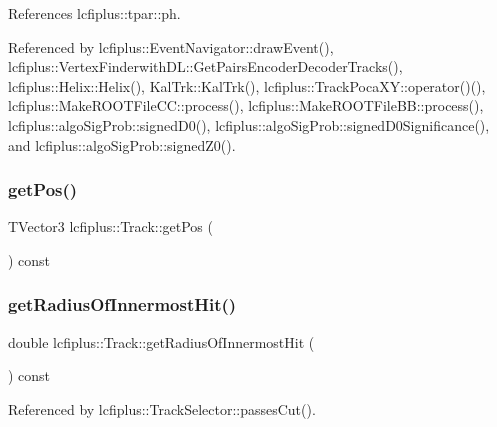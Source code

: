 References lcfiplus\+::tpar\+::ph.



Referenced by lcfiplus\+::\+Event\+Navigator\+::draw\+Event(), lcfiplus\+::\+Vertex\+Finderwith\+D\+L\+::\+Get\+Pairs\+Encoder\+Decoder\+Tracks(), lcfiplus\+::\+Helix\+::\+Helix(), Kal\+Trk\+::\+Kal\+Trk(), lcfiplus\+::\+Track\+Poca\+X\+Y\+::operator()(), lcfiplus\+::\+Make\+R\+O\+O\+T\+File\+C\+C\+::process(), lcfiplus\+::\+Make\+R\+O\+O\+T\+File\+B\+B\+::process(), lcfiplus\+::algo\+Sig\+Prob\+::signed\+D0(), lcfiplus\+::algo\+Sig\+Prob\+::signed\+D0\+Significance(), and lcfiplus\+::algo\+Sig\+Prob\+::signed\+Z0().

\mbox{\label{classlcfiplus_1_1Track_a5e7c6b941542d118604c56a02139d7c2}} 
\subsubsection{get\+Pos()}
{\footnotesize\ttfamily T\+Vector3 lcfiplus\+::\+Track\+::get\+Pos (\begin{DoxyParamCaption}{ }\end{DoxyParamCaption}) const\hspace{0.3cm}{\ttfamily [inline]}}

\mbox{\label{classlcfiplus_1_1Track_a8c70bf1eef9a5d54688c2c680ec3e83e}} 
\subsubsection{get\+Radius\+Of\+Innermost\+Hit()}
{\footnotesize\ttfamily double lcfiplus\+::\+Track\+::get\+Radius\+Of\+Innermost\+Hit (\begin{DoxyParamCaption}{ }\end{DoxyParamCaption}) const\hspace{0.3cm}{\ttfamily [inline]}}



Referenced by lcfiplus\+::\+Track\+Selector\+::passes\+Cut().

\mbox{\label{classlcfiplus_1_1Track_a94a49949c8d4d8f5f103e1c4360609a2}} 
